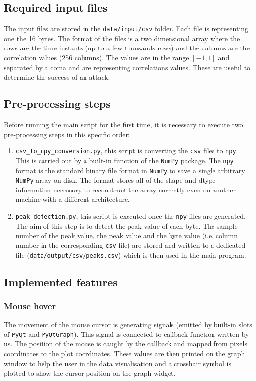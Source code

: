 \documentclass[11pt,a4paper]{article}
\begin{document}
\subsection{Required input files}
The input files are stored in the \texttt{data/input/csv} folder. Each file is representing one the 16 bytes. The format of the files is a two dimensional array where the rows are the time instants (up to a few thousands rows) and the columns are the correlation values (256 columns). The values are in the range $[-1, 1]$ and separated by a coma and are representing correlations values. These are useful to determine the success of an attack.

\subsection{Pre-processing steps}
Before running the main script for the first time, it is necessary to execute two pre-processing steps in this specific order:
\begin{enumerate}
    \item \texttt{csv\_to\_npy\_conversion.py}, this script is converting the \texttt{csv} files to \texttt{npy}. This is carried out by a built-in function of the \texttt{NumPy} package. The \texttt{npy} format is the standard binary file format in \texttt{NumPy} to save a single arbitrary \texttt{NumPy} array on disk. The format stores all of the shape and dtype information necessary to reconstruct the array correctly even on another machine with a different architecture.
    \item \texttt{peak\_detection.py}, this script is executed once the \texttt{npy} files are generated. The aim of this step is to detect the peak value of each byte. The sample number of the peak value, the peak value and the byte value (i.e. column number in the corresponding \texttt{csv} file) are stored and written to a dedicated file (\texttt{data/output/csv/peaks.csv}) which is then used in the main program.
\end{enumerate}

\subsection{Implemented features}
\subsubsection{Mouse hover}
The movement of the mouse cursor is generating signals (emitted by built-in slots of \texttt{PyQt} and \texttt{PyQtGraph}). This signal is connected to callback function written by us. The position of the mouse is caught by the callback and mapped from pixels coordinates to the plot coordinates. These values are then printed on the graph window to help the user in the data visualisation and a crosshair symbol is plotted to show the cursor position on the graph widget.
\end{document}
